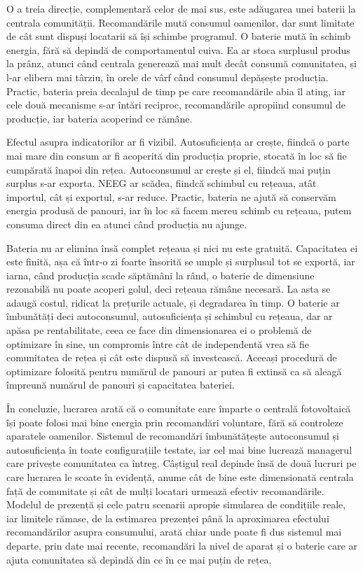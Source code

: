 \documentclass[12pt,a4paper]{report}
\begin{document}
O a treia direcție, complementară celor de mai sus, este adăugarea unei baterii la centrala comunității. Recomandările mută consumul oamenilor, dar sunt limitate de cât sunt dispuși locatarii să își schimbe programul. O baterie mută în schimb energia, fără să depindă de comportamentul cuiva. Ea ar stoca surplusul produs la prânz, atunci când centrala generează mai mult decât consumă comunitatea, și l-ar elibera mai târziu, în orele de vârf când consumul depășește producția. Practic, bateria preia decalajul de timp pe care recomandările abia îl ating, iar cele două mecanisme s-ar întări reciproc, recomandările apropiind consumul de producție, iar bateria acoperind ce rămâne.

Efectul asupra indicatorilor ar fi vizibil. Autosuficiența ar crește, fiindcă o parte mai mare din consum ar fi acoperită din producția proprie, stocată în loc să fie cumpărată înapoi din rețea. Autoconsumul ar crește și el, fiindcă mai puțin surplus s-ar exporta. NEEG ar scădea, fiindcă schimbul cu rețeaua, atât importul, cât și exportul, s-ar reduce. Practic, bateria ne ajută să conservăm energia produsă de panouri, iar în loc să facem mereu schimb cu rețeaua, putem consuma direct din ea atunci când producția nu ajunge.

Bateria nu ar elimina însă complet rețeaua și nici nu este gratuită. Capacitatea ei este finită, așa că într-o zi foarte însorită se umple și surplusul tot se exportă, iar iarna, când producția scade săptămâni la rând, o baterie de dimensiune rezonabilă nu poate acoperi golul, deci rețeaua rămâne necesară. La asta se adaugă costul, ridicat la prețurile actuale, și degradarea în timp. O baterie ar îmbunătăți deci autoconsumul, autosuficiența și schimbul cu rețeaua, dar ar apăsa pe rentabilitate, ceea ce face din dimensionarea ei o problemă de optimizare în sine, un compromis între cât de independentă vrea să fie comunitatea de rețea și cât este dispusă să investească. Aceeași procedură de optimizare folosită pentru numărul de panouri ar putea fi extinsă ca să aleagă împreună numărul de panouri și capacitatea bateriei.

În concluzie, lucrarea arată că o comunitate care împarte o centrală fotovoltaică își poate folosi mai bine energia prin recomandări voluntare, fără să controleze aparatele oamenilor. Sistemul de recomandări îmbunătățește autoconsumul și autosuficiența în toate configurațiile testate, iar cel mai bine lucrează managerul care privește comunitatea ca întreg. Câștigul real depinde însă de două lucruri pe care lucrarea le scoate în evidență, anume cât de bine este dimensionată centrala față de comunitate și cât de mulți locatari urmează efectiv recomandările. Modelul de prezență și cele patru scenarii apropie simularea de condițiile reale, iar limitele rămase, de la estimarea prezenței până la aproximarea efectului recomandărilor asupra consumului, arată chiar unde poate fi dus sistemul mai departe, prin date mai recente, recomandări la nivel de aparat și o baterie care ar ajuta comunitatea să depindă din ce în ce mai puțin de rețea.
\end{document}
